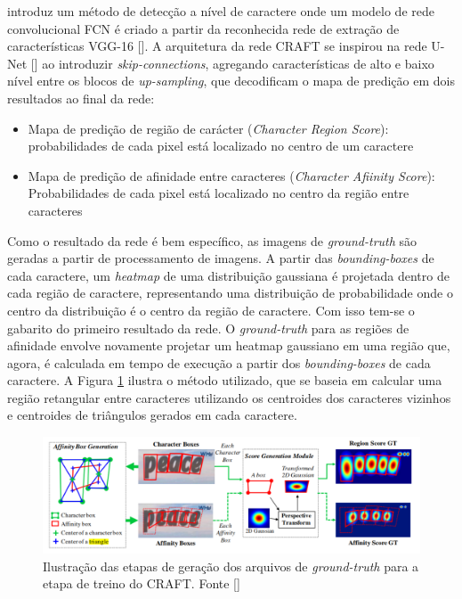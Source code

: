\citeauthor{CRAFT} introduz um método de detecção a nível de caractere onde um modelo de rede convolucional FCN é criado a partir da reconhecida rede de extração de características VGG-16 []. A arquitetura da rede CRAFT se inspirou na rede U-Net [] ao introduzir \textit{skip-connections}, agregando características de alto e baixo nível entre os blocos de \textit{up-sampling}, que decodificam o mapa de predição em dois resultados ao final da rede:

\begin{itemize}
    \item {Mapa de predição de região de carácter (\textit{Character Region Score}): probabilidades de cada pixel está localizado no centro de um caractere}
    \item {Mapa de predição de afinidade entre caracteres (\textit{Character Afiinity Score}): Probabilidades de cada  pixel está localizado no centro da região entre caracteres}
\end{itemize}

Como o resultado da rede é bem específico, as imagens de \textit{ground-truth} são geradas a partir de processamento de imagens. A partir das \textit{bounding-boxes} de cada caractere, um \textit{heatmap} de uma distribuição gaussiana é projetada dentro de cada região de caractere, representando uma distribuição de probabilidade onde o centro da distribuição é o centro da região de caractere. Com isso tem-se o gabarito do primeiro resultado da rede. O \textit{ground-truth} para as regiões de afinidade envolve novamente projetar um heatmap gaussiano em uma região que, agora, é calculada em tempo de execução a partir dos \textit{bounding-boxes} de cada caractere. A Figura \ref{fig:craft_gt}  ilustra o método utilizado, que se baseia em calcular uma região retangular entre caracteres utilizando os centroides dos caracteres vizinhos e centroides de triângulos gerados em cada caractere.

\begin{figure}
    \centering
    \includegraphics[width=\textwidth]{figs/craft-gt.png}
    \caption{Ilustração das etapas de geração dos arquivos de \textit{ground-truth} para a etapa de treino do CRAFT. Fonte []}
    \label{fig:craft_gt}
\end{figure}

